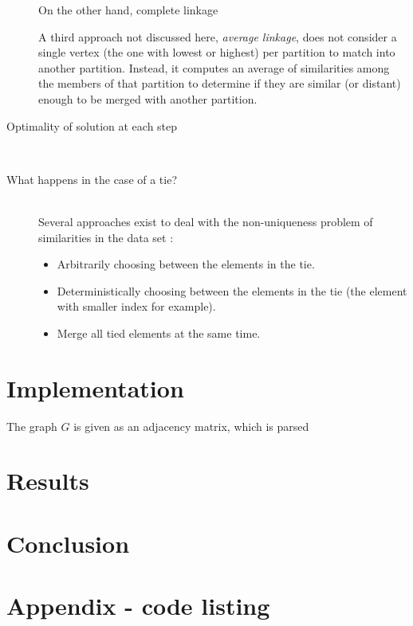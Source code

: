 \documentclass[12pt,a4paper]{article}
\begin{document}
\begin{description}
  On the other hand, complete linkage

  A third approach not discussed here, \emph{average linkage}, does
  not consider a single vertex (the one with lowest or highest) per
  partition to match into another partition. Instead, it computes an
  average of similarities among the members of that partition to
  determine if they are similar (or distant) enough to be merged with
  another partition.

\item[Optimality of solution at each step] \hfill \\



\item[What happens in the case of a tie?]  \hfill \\

  Several approaches exist to deal with the non-uniqueness problem of
  similarities in the data set \cite{nonunique}:

  \begin{itemize}
  \item Arbitrarily choosing between the elements in the tie.
  \item Deterministically choosing between the elements in the tie
    (the element with smaller index for example).
  \item Merge all tied elements at the same time.
  \end{itemize}



\end{description}



\section{Implementation}

The graph $ G $ is given as an adjacency matrix, which is parsed

\section{Results}

\section{Conclusion}




\nocite{*}

\appendix
\section{Appendix - code listing}

\inputminted{python}{../src/main.py}

\end{document}
